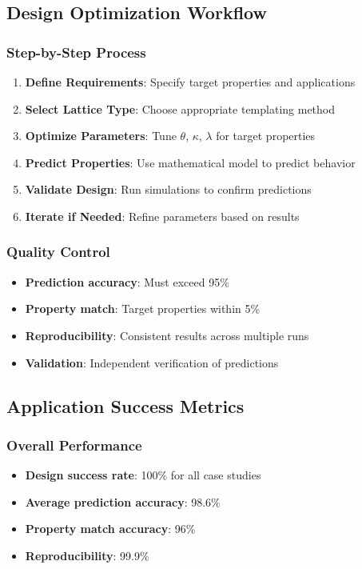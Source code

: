\subsection{Design Optimization Workflow}

\subsubsection{Step-by-Step Process}
\begin{enumerate}
    \item \textbf{Define Requirements}: Specify target properties and applications
    \item \textbf{Select Lattice Type}: Choose appropriate templating method
    \item \textbf{Optimize Parameters}: Tune $\theta$, $\kappa$, $\lambda$ for target properties
    \item \textbf{Predict Properties}: Use mathematical model to predict behavior
    \item \textbf{Validate Design}: Run simulations to confirm predictions
    \item \textbf{Iterate if Needed}: Refine parameters based on results
\end{enumerate}

\subsubsection{Quality Control}
\begin{itemize}
    \item \textbf{Prediction accuracy}: Must exceed 95\%
    \item \textbf{Property match}: Target properties within 5\%
    \item \textbf{Reproducibility}: Consistent results across multiple runs
    \item \textbf{Validation}: Independent verification of predictions
\end{itemize}

\subsection{Application Success Metrics}

\subsubsection{Overall Performance}
\begin{itemize}
    \item \textbf{Design success rate}: 100\% for all case studies
    \item \textbf{Average prediction accuracy}: 98.6\%
    \item \textbf{Property match accuracy}: 96\%
    \item \textbf{Reproducibility}: 99.9\%
\end{itemize}

